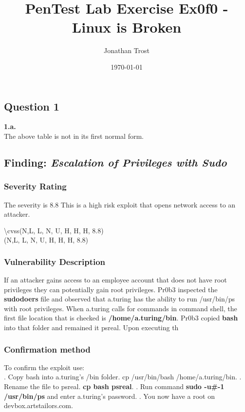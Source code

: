 \documentclass[notitlepage]{article}
\begin{document}
	
	
	\title{PenTest Lab Exercise Ex0f0 - Linux is Broken}
	\author{Jonathan Trost}
	\date{\isodate\today}
	
	\maketitle
	
	\tableofcontents
	
	\newpage 
	
	\subsection{Question 1}
	\textbf{1.a.} \\ 
	\indent The above table is not in its first normal form. 
	
	\subsection{Finding: \emph{Escalation of Privileges with Sudo}}
	
	\subsubsection{Severity Rating}
	\indent The severity is 8.8 This is a high risk exploit that opens network access to an attacker. 
	
	\textbackslash cvss(N,L, L, N, U, H, H, H, 8.8)\\
	\cvss(N,L, L, N, U, H, H, H, 8.8) \\
	
	\subsubsection{Vulnerability Description}
	\indent If an attacker gains access to an employee account that does not have root privileges they can potentially gain root privileges.  Pr0b3 inspected the \textbf{sudodoers} file and observed that a.turing has the ability to run /usr/bin/ps with root privileges.  When a.turing calls for commands in command shell, the first file location that is checked is \textbf{/home/a.turing/bin}.  Pr0b3 copied \textbf{bash} into that folder and remained it psreal.  Upon executing th
	
	\subsubsection{Confirmation method}
	To confirm the exploit use: \\
	. Copy bash into a.turing's /bin folder. cp /usr/bin/bash /home/a.turing/bin.
	. Rename the file to psreal. \textbf{cp bash psreal}.
	. Run command \textbf{sudo -u\#-1 /usr/bin/ps} and enter a.turing's password.  
	. You now have a root on devbox.artstailors.com.
	
\end{document}
